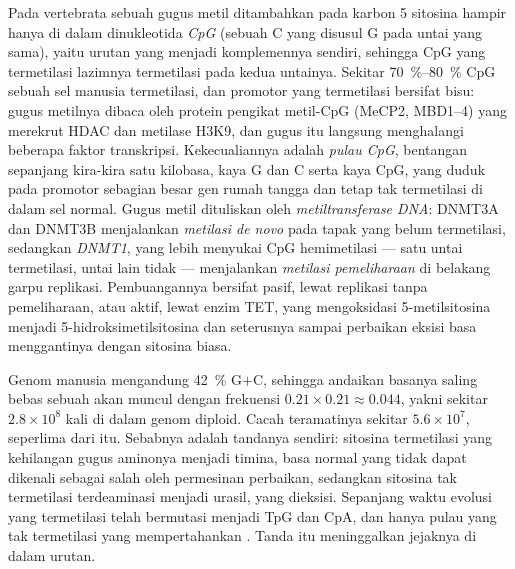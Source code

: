 \begin{definition}\label{def:b3:chromatin-epigenetics:methylation}
%
Pada vertebrata sebuah gugus metil ditambahkan pada karbon 5 sitosina hampir
hanya di dalam dinukleotida \emph{CpG} (sebuah C yang disusul G pada untai
yang sama), yaitu urutan yang menjadi komplemennya sendiri, sehingga CpG yang
termetilasi lazimnya termetilasi pada kedua untainya. Sekitar
\qtyrange{70}{80}{\%} CpG sebuah sel manusia termetilasi, dan promotor yang
termetilasi bersifat bisu: gugus metilnya dibaca oleh protein pengikat
metil-CpG (MeCP2, MBD1--4) yang merekrut HDAC dan metilase H3K9, dan gugus itu
langsung menghalangi beberapa faktor transkripsi. Kekecualiannya adalah
\emph{pulau CpG}, bentangan sepanjang kira-kira satu kilobasa, kaya G dan C
serta kaya CpG, yang duduk pada promotor sebagian besar gen rumah tangga dan
tetap tak termetilasi di dalam sel normal. Gugus metil dituliskan oleh
\emph{metiltransferase DNA}: DNMT3A dan DNMT3B menjalankan \emph{metilasi de
novo} pada tapak yang belum termetilasi, sedangkan \emph{DNMT1}, yang lebih
menyukai CpG hemimetilasi --- satu untai termetilasi, untai lain tidak ---
menjalankan \emph{metilasi pemeliharaan} di belakang garpu replikasi.
Pembuangannya bersifat pasif, lewat replikasi tanpa pemeliharaan, atau aktif,
lewat enzim TET, yang mengoksidasi 5-metilsitosina menjadi
5-hidroksimetilsitosina dan seterusnya sampai perbaikan eksisi basa
menggantinya dengan sitosina biasa.
\end{definition}

\begin{example}\label{ex:b3:chromatin-epigenetics:cpg-deficit}
Genom manusia mengandung \qty{42}{\%} G$+$C, sehingga andaikan basanya saling
bebas sebuah  akan muncul dengan frekuensi $0.21\times 0.21 \approx 0.044$,
yakni sekitar $2.8\times 10^{8}$ kali di dalam genom diploid. Cacah
teramatinya sekitar $5.6\times 10^{7}$, seperlima dari itu. Sebabnya adalah
tandanya sendiri: sitosina termetilasi yang kehilangan gugus aminonya menjadi
timina, basa normal yang tidak dapat dikenali sebagai salah oleh permesinan
perbaikan, sedangkan sitosina tak termetilasi terdeaminasi menjadi urasil,
yang dieksisi. Sepanjang waktu evolusi  yang termetilasi telah bermutasi
menjadi TpG dan CpA, dan hanya pulau yang tak termetilasi yang mempertahankan
. Tanda itu meninggalkan jejaknya di dalam urutan.
\end{example}

